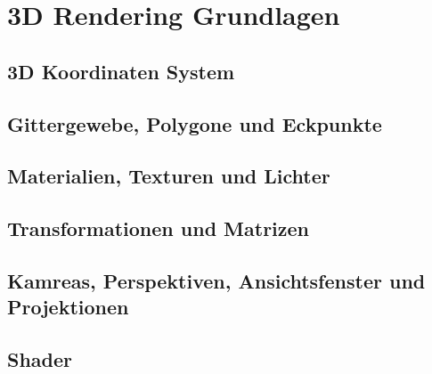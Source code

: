 \section{3D Rendering Grundlagen}
\subsection{3D Koordinaten System}
\subsection{Gittergewebe, Polygone und Eckpunkte}
\subsection{Materialien, Texturen und Lichter}
\subsection{Transformationen und Matrizen}
\subsection{Kamreas, Perspektiven, Ansichtsfenster und Projektionen}
\subsection{Shader}

